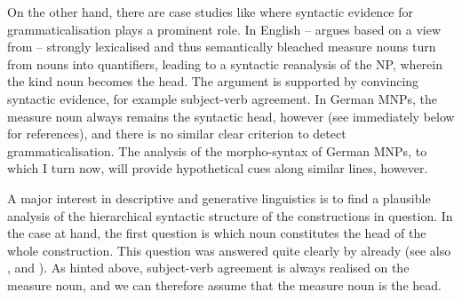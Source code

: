 \documentclass[USenglish]{article}
\begin{document}
On the other hand, there are case studies like \cite{Brems2003,DeclerckBrems2016} where syntactic evidence for grammaticalisation plays a prominent role.
In English -- \cite{Brems2003} argues based on a view from \cite{Langacker1991} -- strongly lexicalised and thus semantically bleached measure nouns turn from nouns into quantifiers, leading to a syntactic reanalysis of the NP, wherein the kind noun becomes the head.
The argument is supported by convincing syntactic evidence, for example subject-verb agreement.
In German MNPs, the measure noun always remains the syntactic head, however (see immediately below for references), and there is no similar clear criterion to detect grammaticalisation.
The analysis of the morpho-syntax of German MNPs, to which I turn now, will provide hypothetical cues along similar lines, however.

A major interest in descriptive and generative linguistics is to find a plausible analysis of the hierarchical syntactic structure of the constructions in question.
In the case at hand, the first question is which noun constitutes the head of the whole construction.
This question was answered quite clearly by \cite{Loebel1986} already (see also \citealp[213]{Eschenbach1994}, and \citealp[16]{GallmannLindauer1994}).
As hinted above, subject-verb agreement is always realised on the measure noun, and we can therefore assume that the measure noun is the head.
\end{document}
